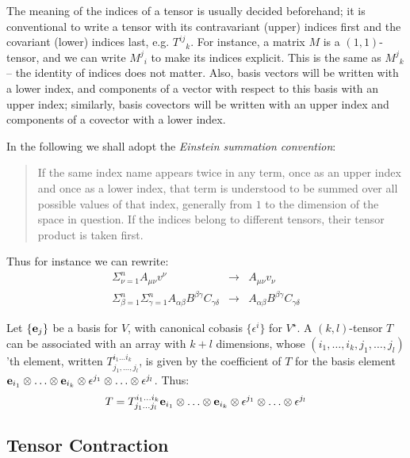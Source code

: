 The meaning of the indices of a tensor is usually decided beforehand; it is conventional to write a tensor with its contravariant (upper) indices first and the covariant (lower) indices last, e.g.{} \({T^{ij}}_k\). For instance, a matrix \(M\) is a \((1,1)\)-tensor, and we can write \({M^j}_i\) to make its indices explicit. This is the same as \({M^j}_k\) -- the identity of indices does not matter. Also, basis vectors will be written with a lower index, and components of a vector with respect to this basis with an upper index; similarly, basis covectors will be written with an upper index and components of a covector with a lower index. 


In the following we shall adopt the {\em Einstein summation convention}:
\begin{quotation}
  If the same index name appears twice in any term, once as an upper index and once as a lower index, that term is understood to be summed over all possible values of that index, generally from \(1\) to the dimension of the space in question. If the indices belong to different tensors, their tensor product is taken first.
\end{quotation}
Thus for instance we can rewrite:
\[
\begin{array}{lcl}
  \Sigma_{\nu=1}^n A_{\mu\nu}v^{\nu} & \rightarrow &   A_{\mu\nu}v_{\nu}\\
  \Sigma_{\beta=1}^n \Sigma_{\gamma=1}^n A _{\alpha \beta}B^{\beta \gamma}C_{\gamma \delta} & \rightarrow & A_{\alpha \beta}B^{\beta \gamma}C_{\gamma \delta}
\end{array}
\]

Let \(\{{\bf e}_j\}\) be a basis for \(V\), with canonical cobasis \(\{\epsilon^i\}\) for \(V^{\star}\). 
A \((k,l)\)-tensor \(T\) can be associated with an array with \(k+l\) dimensions, whose \((i_1, \ldots, i_k, j_1, \ldots, j_l)\)'th element, written \(T^{i_1\ldots i_k}_{j_1, \ldots, j_l}\), is given by the coefficient of \(T\) for the basis element \({\bf e}_{i_1}\otimes \ldots \otimes {\bf e}_{i_k}\otimes \epsilon^{j_1}\otimes \ldots \otimes \epsilon^{j_l}\). Thus:
\[ T = T^{i_1 \ldots i_k}_{j_1 \ldots j_l} {\bf e}_{i_1}\otimes \ldots \otimes {\bf e}_{i_k}\otimes \epsilon^{j_1}\otimes \ldots \otimes \epsilon^{j_l}
\]



\subsection{Tensor Contraction}\label{sec:summation-convention}


